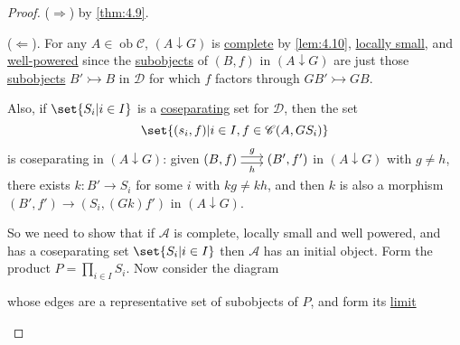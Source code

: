 \documentclass{article}
\DeclareMathOperator{\ob}{ob}
\newenvironment{tikzcdi}{\begin{tikzcd}[cramped, sep=scriptsize]}{\end{tikzcd}}
\let\to\longrightarrow
\begin{document}
\begin{proof}
  ($\Rightarrow$) by \cref{thm:4.9}.

  ($\Leftarrow$). For any $A \in \ob \mathscr{C}$, $(A \downarrow G)$ is \hyperlink{def:complete}{complete} by \cref{lem:4.10}, \hyperlink{def:lsmall}{locally small}, and \hyperlink{def:wp}{well-powered} since the \hyperlink{def:subobj}{subobjects} of $(B,f)$ in $(A \downarrow G)$ are just those \hyperlink{def:subobj}{subobjects} $B' \rightarrowtail B$ in $\mathscr{D}$ for which $f$ factors through $GB' \rightarrowtail GB$.

  Also, if $\set{S_i | i \in I}$ is a \hyperlink{def:separating}{coseparating} set for $\mathscr{D}$, then the set
  \begin{equation*}\set{(s_i, f) | i \in I, f \in \mathscr{C}(A, GS_i)}\end{equation*}
  is coseparating in $(A \downarrow G)$:
  given $\begin{tikzcdi}(B,f) \rar[shift left]{g}\rar[shift right, ']{h} & (B',f')\end{tikzcdi}$ in $(A \downarrow G)$ with $g \neq h$, there exists $k: B' \to S_i$ for some $i$ with $kg \neq kh$, and then $k$ is also a morphism $(B', f') \to (S_i, (Gk) f')$ in $(A\downarrow G)$.

  So we need to show that if $\mathscr{A}$ is complete, locally small and well powered, and has a coseparating set $\set{S_i | i \in I}$ then $\mathscr{A}$ has an initial object.
  Form the product $P = \prod_{i \in I} S_i$. Now consider the diagram
  \begin{center}
  \end{center}
  whose edges are a representative set of subobjects of $P$, and form its \hyperlink{def:limit}{limit}
  \begin{center}
  \end{center}


\end{proof}
\end{document}
